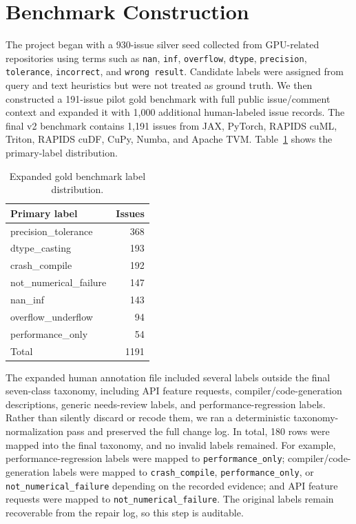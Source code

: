 \documentclass[conference]{IEEEtran}
\begin{document}
\section{Benchmark Construction}

The project began with a 930-issue silver seed collected from GPU-related
repositories using terms such as \texttt{nan}, \texttt{inf},
\texttt{overflow}, \texttt{dtype}, \texttt{precision}, \texttt{tolerance},
\texttt{incorrect}, and \texttt{wrong result}. Candidate labels were assigned
from query and text heuristics but were not treated as ground truth. We then
constructed a 191-issue pilot gold benchmark with full public issue/comment
context and expanded it with 1,000 additional human-labeled issue records. The
final v2 benchmark contains 1,191 issues from JAX, PyTorch, RAPIDS cuML,
Triton, RAPIDS cuDF, CuPy, Numba, and Apache TVM. Table~\ref{tab:labels}
shows the primary-label distribution.

\begin{table}[t]
\centering
\caption{Expanded gold benchmark label distribution.}
\label{tab:labels}
\begin{tabular}{lr}
\toprule
Primary label & Issues \\
\midrule
precision\_tolerance & 368 \\
dtype\_casting & 193 \\
crash\_compile & 192 \\
not\_numerical\_failure & 147 \\
nan\_inf & 143 \\
overflow\_underflow & 94 \\
performance\_only & 54 \\
\midrule
Total & 1191 \\
\bottomrule
\end{tabular}
\end{table}

The expanded human annotation file included several labels outside the final
seven-class taxonomy, including API feature requests, compiler/code-generation
descriptions, generic needs-review labels, and performance-regression labels.
Rather than silently discard or recode them, we ran a deterministic
taxonomy-normalization pass and preserved the full change log. In total, 180
rows were mapped into the final taxonomy, and no invalid labels remained. For
example, performance-regression labels were mapped to \texttt{performance\_only};
compiler/code-generation labels were mapped to \texttt{crash\_compile},
\texttt{performance\_only}, or \texttt{not\_numerical\_failure} depending on
the recorded evidence; and API feature requests were mapped to
\texttt{not\_numerical\_failure}. The original labels remain recoverable from
the repair log, so this step is auditable.
\end{document}

